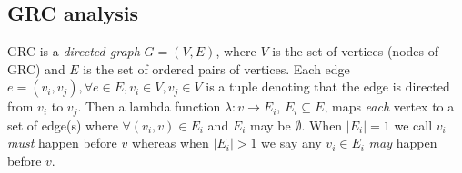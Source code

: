 \subsection{GRC analysis}
\label{sec:agrc-analysis}


GRC is a \textit{directed graph} $G =(V,E)$, where $V$ is the set of
vertices (nodes of GRC) and $E$ is the set of ordered pairs of
vertices. Each edge
$e = (v_i,v_j), \forall e \in E, v_i \in V, v_j \in V$ is a tuple
denoting that the edge is directed from $v_i$ to $v_j$.  Then a lambda
function $\lambda:v \rightarrow E_i$, $E_i \subseteq E$, maps
\textit{each} vertex to a set of edge(s) where $\forall (v_i,v) \in E_i$
and $E_i$ may be $\emptyset$. When $|E_i| = 1$ we call $v_i$
\textit{must} happen before $v$ whereas when $|E_i| > 1$ we say any
$v_i \in E_i$ \textit{may} happen before $v$.

